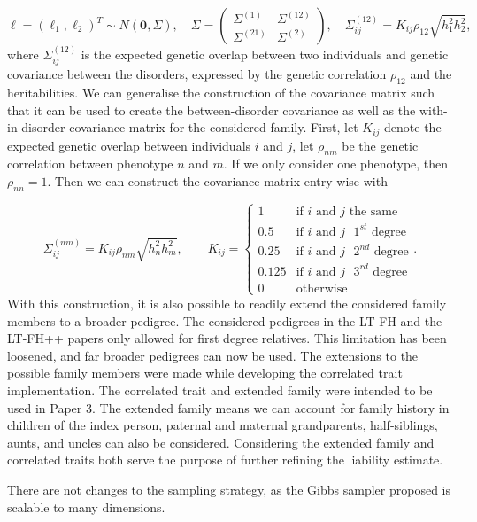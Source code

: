 \begin{equation*}
	\ell = \left(\ell_1, \ell_2\right)^T \sim N(\mathbf{0}, \Sigma), \quad \Sigma = 
	\begin{pmatrix} 
		\Sigma^{(1)} & \Sigma^{(12)} \\
		\Sigma^{(21)} & \Sigma^{(2)} 
	\end{pmatrix}, \quad \Sigma^{(12)}_{ij} = K_{ij}\rho_{12}\sqrt{h_1^2 h_2^2},
\end{equation*}
where $ \Sigma_{ij}^{(12)} $ is the expected genetic overlap between two individuals and genetic covariance between the disorders, expressed by the genetic correlation $ \rho_{12} $ and the heritabilities. We can generalise the construction of the covariance matrix such that it can be used to create the between-disorder covariance as well as the with-in disorder covariance matrix for the considered family. First, let $ K_{ij} $ denote the expected genetic overlap between individuals $ i $ and $ j $, let $ \rho_{nm} $ be the genetic correlation between phenotype $ n $ and $ m $. If we only consider one phenotype, then $ \rho_{nn} = 1$. Then we can construct the covariance matrix entry-wise with 

\begin{equation*}
	\Sigma^{(nm)}_{ij} = K_{ij} \rho_{nm}\sqrt{h^2_{n}h^2_{m}}, \qquad K_{ij} = 
	\begin{cases} 
		1 		& \text{if } i \text{ and } j \text{ the same} \\
		0.5 	& \text{if } i \text{ and } j \text{ $1^{st}$ degree} \\
		0.25 	& \text{if } i \text{ and } j \text{ $2^{nd}$ degree} \\ 
		0.125 	& \text{if } i \text{ and } j \text{ $3^{rd}$ degree}  \\
		0 		& \text{otherwise}
	\end{cases}.
\end{equation*}
With this construction, it is also possible to readily extend the considered family members to a broader pedigree. The considered pedigrees in the LT-FH and the LT-FH++ papers only allowed for first degree relatives. This limitation has been loosened, and far broader pedigrees can now be used. The extensions to the possible family members were made while developing the correlated trait implementation. The correlated trait and extended family were intended to be used in Paper 3. The extended family means we can account for family history in children of the index person, paternal and maternal grandparents, half-siblings, aunts, and uncles can also be considered. Considering the extended family and correlated traits both serve the purpose of further refining the liability estimate.

There are not changes to the sampling strategy, as the Gibbs sampler proposed is scalable to many dimensions.
